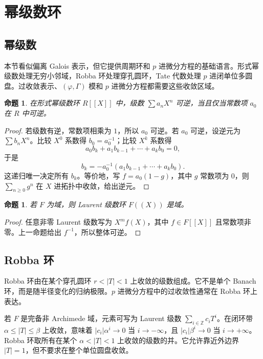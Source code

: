 \documentclass[11pt,a4paper,openany]{ctexbook}
\numberwithin{equation}{chapter}
\newcommand{\Z}{\mathbb{Z}}
\theoremstyle{plain}
\newtheorem{proposition}[theorem]{命题}
\theoremstyle{definition}
\theoremstyle{remark}
\begin{document}
\section{幂级数环}

\subsection{幂级数}

本节看似偏离 Galois 表示，但它提供周期环和 $p$ 进微分方程的基础语言。形式幂级数处理无穷小邻域，Robba 环处理穿孔圆环，Tate 代数处理 $p$ 进闭单位多圆盘。过收敛表示、$(\varphi,\Gamma)$ 模和 $p$ 进微分方程都需要这些收敛区域。

\begin{proposition}
在形式幂级数环 $R[[X]]$ 中，级数 $\sum a_nX^n$ 可逆，当且仅当常数项 $a_0$ 在 $R$ 中可逆。
\end{proposition}

\begin{proof}
若级数有逆，常数项相乘为 $1$，所以 $a_0$ 可逆。若 $a_0$ 可逆，设逆元为 $\sum b_nX^n$。比较 $X^0$ 系数得 $b_0=a_0^{-1}$；比较 $X^k$ 系数得
\[
  a_0b_k+a_1b_{k-1}+\cdots+a_kb_0=0,
\]
于是
\[
  b_k=-a_0^{-1}(a_1b_{k-1}+\cdots+a_kb_0).
\]
这递归唯一决定所有 $b_k$。等价地，写 $f=a_0(1-g)$，其中 $g$ 常数项为 $0$，则 $\sum_{n\ge0}g^n$ 在 $X$ 进拓扑中收敛，给出逆元。
\end{proof}

\begin{proposition}
若 $F$ 为域，则 Laurent 级数环 $F((X))$ 是域。
\end{proposition}

\begin{proof}
任意非零 Laurent 级数写为 $X^mf(X)$，其中 $f\in F[[X]]$ 且常数项非零。上一命题给出 $f^{-1}$，所以整体可逆。
\end{proof}

\subsection{Robba 环}

Robba 环由在某个穿孔圆环 $r<|T|<1$ 上收敛的级数组成。它不是单个 Banach 环，而是随半径变化的归纳极限。$p$ 进微分方程中的过收敛性通常在 Robba 环上表达。

若 $F$ 是完备非 Archimede 域，元素可写为 Laurent 级数 $\sum_{i\in\Z}c_iT^i$。在闭环带 $\alpha\le |T|\le\beta$ 上收敛，意味着 $|c_i|\alpha^i\to0$ 当 $i\to-\infty$，且 $|c_i|\beta^i\to0$ 当 $i\to+\infty$。Robba 环取所有在某个 $\alpha<|T|<1$ 上收敛的级数的并。它允许靠近外边界 $|T|=1$，但不要求在整个单位圆盘收敛。
\end{document}
